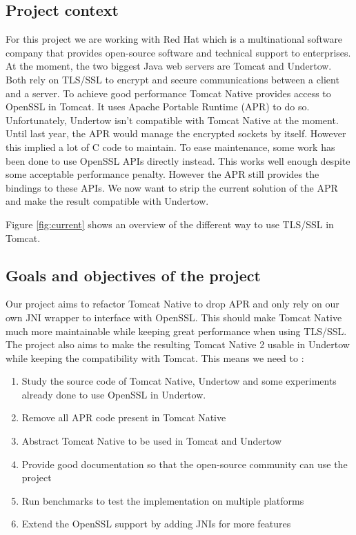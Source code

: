 \documentclass[11pt,a4paper,bibliography=totocnumbered]{scrartcl}
\def\mytitle{Tomcat Native 2}
\def\theclient{Red Hat}
\begin{document}
\subsection{Project context}
For this project we are working with \theclient{} which is a multinational software company that provides open-source software and technical support to enterprises\autocite{redhat}.
At the moment, the two biggest Java web servers are Tomcat\autocite{tomcat} and Undertow\autocite{undertow}. Both rely on TLS/SSL to encrypt and secure communications between a client and a server. To achieve good performance Tomcat Native\autocite{tomcat-native} provides access to OpenSSL in Tomcat. It uses Apache Portable Runtime (APR) to do so. 
Unfortunately, Undertow isn't compatible with Tomcat Native at the moment.
Until last year, the APR would manage the encrypted sockets by itself. However this implied a lot of C code to maintain. To ease maintenance, some work has been done to use OpenSSL APIs directly instead. This works well enough despite some acceptable performance penalty. However the APR still provides the bindings to these APIs.
We now want to strip the current solution of the APR and make the result compatible with Undertow.

Figure \ref{fig:current} shows an overview of the different way to use TLS/SSL in Tomcat.

\subsection{Goals and objectives of the project}

Our project aims to refactor Tomcat Native to drop APR and only rely on our own JNI wrapper to interface with OpenSSL. This should make Tomcat Native much more maintainable while keeping great performance when using TLS/SSL. The project also aims to make the resulting \mytitle{} usable in Undertow while keeping the compatibility with Tomcat.
This means we need to :
\begin{enumerate}
\item Study the source code of Tomcat Native, Undertow and some experiments already done to use OpenSSL in Undertow.
\item Remove all APR code present in Tomcat Native
\item Abstract Tomcat Native to be used in Tomcat and Undertow
\item Provide good documentation so that the open-source community can use the project
\item Run benchmarks to test the implementation on multiple platforms
\item Extend the OpenSSL support by adding JNIs for more features
\end{enumerate}
\end{document}
